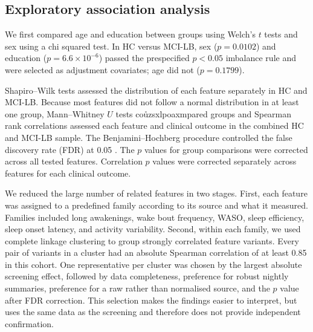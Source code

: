 \documentclass[referee,pdflatex,sn-vancouver-num]{sn-jnl}
\begin{document}

\subsection{Exploratory association analysis}\label{subsec:statistics}

We first compared age and education between groups using Welch's
$t$ tests and sex using a chi squared test. In HC versus MCI-LB, sex
($p=0.0102$) and education ($p=6.6\times10^{-6}$) passed the prespecified
$p<0.05$ imbalance rule and were selected as adjustment covariates; age did not
($p=0.1799$).

Shapiro--Wilk tests assessed the distribution of each feature separately in HC and
MCI-LB. Because most features did not follow a normal distribution in at least one group,
Mann--Whitney $U$ tests coůzsxlpoaxmpared groups and Spearman rank correlations assessed
each feature and clinical outcome in the combined HC and MCI-LB sample. The
Benjamini--Hochberg procedure controlled the false discovery rate (FDR) at 0.05
\cite{benjamini1995fdr}. The $p$ values for group comparisons were corrected across all
tested features. Correlation $p$ values were corrected separately across
features for each clinical outcome.

We reduced the large number of related features in two stages. First, each
feature was assigned to a predefined family according to its source and what it
measured. Families included long awakenings, wake bout frequency, WASO, sleep
efficiency, sleep onset latency, and activity variability. Second, within each family,
we used complete linkage clustering to group strongly correlated feature variants.
Every pair of variants in a cluster had an absolute Spearman correlation of at
least 0.85 in this cohort. One representative per
cluster was chosen by the largest absolute screening effect, followed by data
completeness, preference for robust nightly summaries, preference for a raw
rather than normalised source, and the $p$ value after FDR correction. This
selection makes the findings easier to interpret, but uses the same data as
the screening and therefore does not provide independent confirmation.
\end{document}
